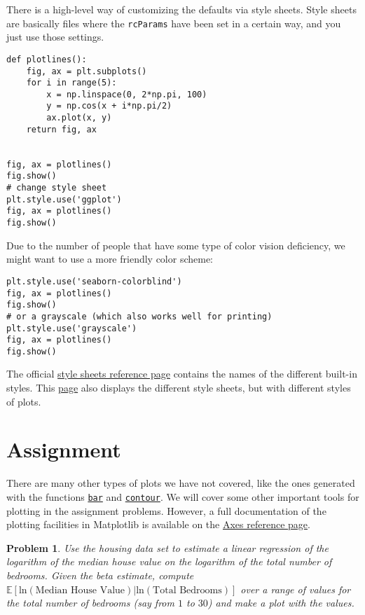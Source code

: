 \documentclass[12pt, a4paper]{article}
\newcommand{\E}[1]{\mathbb{E}{\left[#1\right]}}
\renewcommand{\ln}[1]{\text{ln}\left(#1\right)}
\newtheorem{problem}{Problem}
\begin{document}
There is a high-level way of customizing the defaults via style sheets.
Style sheets are basically files where the \texttt{rcParams} have been set in a certain way, and you just use those settings.
\lstset{language=jupyter-python,label= ,caption= ,captionpos=b,numbers=none}
\begin{lstlisting}
def plotlines():
    fig, ax = plt.subplots()
    for i in range(5):
        x = np.linspace(0, 2*np.pi, 100)
        y = np.cos(x + i*np.pi/2)
        ax.plot(x, y)
    return fig, ax


fig, ax = plotlines()
fig.show()
# change style sheet
plt.style.use('ggplot')
fig, ax = plotlines()
fig.show()
\end{lstlisting}

Due to the number of people that have some type of color vision deficiency, we might want to use a more friendly color scheme:
\lstset{language=jupyter-python,label= ,caption= ,captionpos=b,numbers=none}
\begin{lstlisting}
plt.style.use('seaborn-colorblind')
fig, ax = plotlines()
fig.show()
# or a grayscale (which also works well for printing)
plt.style.use('grayscale')
fig, ax = plotlines()
fig.show()
\end{lstlisting}
The official \href{https://matplotlib.org/gallery/style\_sheets/style\_sheets\_reference.html}{style sheets reference page} contains the names of the different built-in styles. This \href{https://tonysyu.github.io/raw\_content/matplotlib-style-gallery/gallery.html}{page} also displays the different style sheets, but with different styles of plots.

\section{Assignment}
\label{sec:orged932ae}
There are many other types of plots we have not covered, like the ones generated with the functions \href{https://matplotlib.org/3.1.1/api/\_as\_gen/matplotlib.axes.Axes.bar.html\#matplotlib.axes.Axes.bar}{\texttt{bar}} and \href{https://matplotlib.org/3.1.1/api/\_as\_gen/matplotlib.axes.Axes.contour.html\#matplotlib.axes.Axes.contour}{\texttt{contour}}.
We will cover some other important tools for plotting in the assignment problems.
However, a full documentation of the plotting facilities in Matplotlib is available on the \href{https://matplotlib.org/api/axes\_api.html\#plotting}{Axes reference page}.

\begin{problem}
Use the housing data set to estimate a linear regression of the logarithm of the median house value on the logarithm of the total number of bedrooms.
Given the beta estimate, compute \(\E{\ln{\text{Median House Value}}\vert\ln{\text{Total Bedrooms}}}\) over a range of values for the total number of bedrooms (say from \(1\) to \(30\)) and make a plot with the values.
\end{problem}
\end{document}
